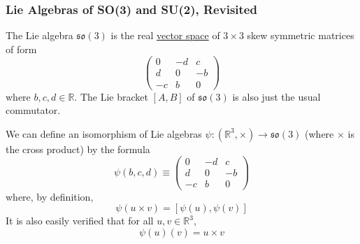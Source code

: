   \subsubsection{Lie Algebras of SO(3) and SU(2), Revisited}

    \begin{example}
      \label{ex:the-lie-algebra-mathfrakso3}
      The Lie algebra $\mathfrak{so}(3)$ is the real \hyperref[def:vector-space]{vector space} of $3 \times 3$ skew symmetric matrices of form 
      \begin{equation}
        \begin{pmatrix}
        0 & -d & c \\ d & 0 & -b \\ -c & b & 0
        \end{pmatrix}
      \end{equation}
      where $b, c, d \in \mathbb{R}$. The Lie bracket $[A,B]$ of $\mathfrak{so}(3)$ is also just the usual commutator. 

      We can define an isomorphism of Lie algebras $\psi: (\mathbb{R}^3, \times) \rightarrow \mathfrak{so}(3)$ (where $\times$ is the cross product) by the formula 
      \begin{equation}
        \psi(b, c, d) \equiv \begin{pmatrix}
        0 & -d & c \\
        d & 0 & -b \\
        -c & b & 0
        \end{pmatrix}
      \end{equation}
      where, by definition, 
      \begin{equation}
        \psi(u \times v) = [\psi(u), \psi(v)]
      \end{equation}
      It is also easily verified that for all $u, v \in \mathbb{R}^3$, 
      \begin{equation}
        \psi(u) (v) = u \times v
      \end{equation}
    \end{example}

